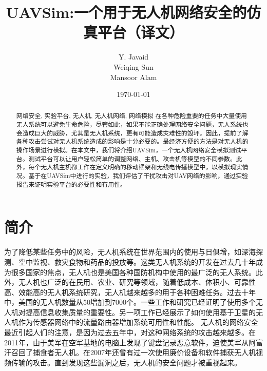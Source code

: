 \documentclass[bachelor,fontset=fandol,AutoFakeBold=true]{nuaathesis}
\begin{document}
\title{UAVSim:一个用于无人机网络安全的仿真平台（译文）}
\author{Y. Javaid \\ Weiqing Sun\\ Mansoor Alam}
\date{\today}
\maketitle

\frontmatter                            %
\tableofcontents                   %
\begin{abstract}{网络安全, 实验平台, 无人机, 无人机网络, 网络模拟}
在各种危险重要的任务中大量使用无人系统可以避免生命危险，尽管如此，如果不能正确处理网络安全问题，无人系统也会造成巨大的威胁，尤其是无人机系统，更有可能造成灾难性的毁坏。因此，提前了解各种攻击尝试对无人机系统造成的影响是十分必要的。最经济方便的方法是对无人机的操作场景进行模拟。在本文中，我们将介绍UAVSim，一个无人机网络安全模拟测试平台。测试平台可以让用户轻松简单的调整网络、主机、攻击机等模型的不同参数。此外，每个无人机主机都工作在定义明确的移动框架和无线电传播模型中，以模拟现实情况。基于在UAVSim中进行的实验，我们评估了干扰攻击对UAV网络的影响，通过实验报告来证明实验平台的必要性和有用性。
\end{abstract}
\mainmatter                             %
\pagestyle{plain}                       %

\chapter{简介}
为了降低某些任务中的风险，无人机系统在世界范围内的使用与日俱增，如深海探测、空中监视、救灾食物和药品的投放等。这类无人机系统的开发在过去几十年成为很多国家的焦点，无人机也是美国各种国防机构中使用的最广泛的无人系统。此外，无人机也广泛的在民用、农业、研究等领域，随着低成本、体积小、可靠性高、效能高的无人机系统研究，无人机越来越多的用于各种困难任务。过去十年中，美国的无人机数量从50增加到7000个\cite{1bumiller2011war}。一些工作和研究已经证明了使用多个无人机对提高信息收集质量的重要性\cite{2dixon2006automation}。另一项工作已经展示了如何使用基于卫星的无人机作为传感器网络中的流量路由器增加系统可用性和性能\cite{3puchaty2011performance}。
无人机的网络安全最近引起人们的注意，是因为过去五年中，对这种网络系统的攻击越来越多。在2011年，由于美军在空军基地的电脑上发现了键盘记录恶意软件\cite{4arthur2009skygrabber}，迫使美军从阿富汗召回了捕食者无人机。在2007年还曾有过一次使用廉价设备和软件捕获无人机视频传输的攻击\cite{5virus-uav}。直到发现这些漏洞之后，无人机的安全问题才被重视起来。
\end{document}
